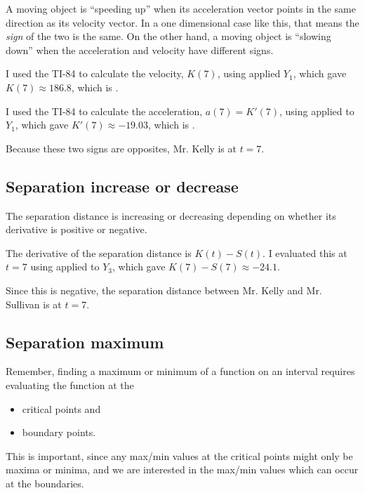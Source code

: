 \documentclass[12pt,letterpaper]{memoir}
\begin{document}
A moving object is ``speeding up'' when 
its acceleration vector points in the same direction as its velocity vector.
In a one dimensional case like this, 
that means the {\itshape sign} of the two is the same.
On the other hand, 
a moving object is ``slowing down'' when 
the acceleration and velocity have different signs.

I used the TI-84 to calculate the velocity, $K(7)$, using 
{\ttfamily [2ND] [CALC] [value] } applied $Y_1$, which gave $K(7) \approx 186.8$, 
which is .

I used the TI-84 to calculate the acceleration, $a(7) = K'(7)$, using 
{\ttfamily [MATH] [8]} applied to $Y_1$, which gave $K'(7) \approx -19.03$, 
which is .


\begin{tcolorbox}[colback=white]
    Because these two signs are opposites, Mr. Kelly is  at $t=7$.
\end{tcolorbox}




\subsection{Separation increase or decrease} 

The separation distance is increasing or decreasing depending on whether its derivative 
is positive or negative. 

The derivative of the separation distance is $K(t) - S(t)$.
I evaluated this at $t=7$ using 
{\ttfamily [2ND] [CALC] [value]} applied to $Y_3$, which gave $K(7) - S(7) \approx -24.1$.
\begin{tcolorbox}[colback=white]
    Since this is negative, the separation distance between Mr. Kelly and Mr. Sullivan is  at $t=7$.
\end{tcolorbox}


\subsection{Separation maximum}

Remember, 
finding a maximum or minimum of a function on an interval requires evaluating the function at the
\begin{itemize}[nosep]
    \item {critical points} and 
    \item boundary points.
\end{itemize}
This is important, since any max/min values at the critical points  
might only be  maxima or minima, 
and we are interested in the  max/min values 
which can occur at the boundaries.
\end{document}
